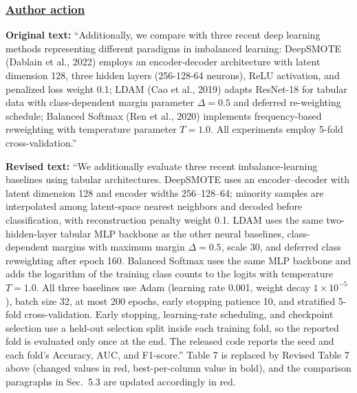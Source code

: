 \documentclass[journal,12pt, onecolumn]{IEEEtran}
\begin{document}
{\color{black}
\subsubsection*{\textbf{\underline{Author action}}}
\begin{center}
{\color{red}}
\end{center}
\textbf{Original text:} ``Additionally, we compare with three recent deep learning methods representing different paradigms in imbalanced learning: DeepSMOTE (Dablain et al., 2022) employs an encoder-decoder architecture with latent dimension 128, three hidden layers (256-128-64 neurons), ReLU activation, and penalized loss weight 0.1; LDAM (Cao et al., 2019) adapts ResNet-18 for tabular data with class-dependent margin parameter $\Delta=0.5$ and deferred re-weighting schedule; Balanced Softmax (Ren et al., 2020) implements frequency-based reweighting with temperature parameter $T=1.0$. All experiments employ 5-fold cross-validation.''

\textbf{Revised text:} ``{\color{red}We additionally evaluate three recent imbalance-learning baselines using tabular architectures. DeepSMOTE uses an encoder--decoder with latent dimension 128 and encoder widths 256--128--64; minority samples are interpolated among latent-space nearest neighbors and decoded before classification, with reconstruction penalty weight 0.1. LDAM uses the same two-hidden-layer tabular MLP backbone as the other neural baselines, class-dependent margins with maximum margin $\Delta=0.5$, scale 30, and deferred class reweighting after epoch 160. Balanced Softmax uses the same MLP backbone and adds the logarithm of the training class counts to the logits with temperature $T=1.0$. All three baselines use Adam (learning rate 0.001, weight decay $1\times10^{-5}$), batch size 32, at most 200 epochs, early stopping patience 10, and stratified 5-fold cross-validation. Early stopping, learning-rate scheduling, and checkpoint selection use a held-out selection split inside each training fold, so the reported fold is evaluated only once at the end. The released code reports the seed and each fold's Accuracy, AUC, and F1-score.}'' Table 7 is replaced by Revised Table 7 above (changed values in red, best-per-column value in bold), and the comparison paragraphs in Sec.~5.3 are updated accordingly in red.

}
\end{document}
